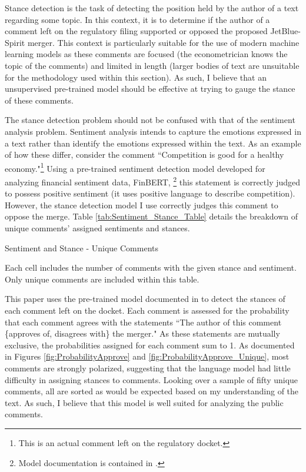 \documentclass{article}
\begin{document}
\begin{appendices}
Stance detection is the task of detecting the position held by the author of a text regarding some topic. In this context, it is to determine if the author of a comment left on the regulatory filing supported or opposed the proposed JetBlue-Spirit merger. This context is particularly suitable for the use of modern machine learning models as these comments are focused (the econometrician knows the topic of the comments) and limited in length (larger bodies of text are unsuitable for the methodology used within this section). As such, I believe that an unsupervised pre-trained model should be effective at trying to gauge the stance of these comments. 

The stance detection problem should not be confused with that of the sentiment analysis problem. Sentiment analysis intends to capture the emotions expressed in a text rather than identify the emotions expressed within the text. As an example of how these differ, consider the comment ``Competition is good for a healthy economy."\footnote{This is an actual comment left on the regulatory docket.} Using a pre-trained sentiment detection model developed for analyzing financial sentiment data, FinBERT, \footnote{Model documentation is contained in \citet{araci_finbert_2019}.} this statement is correctly judged to possess positive sentiment (it uses positive language to describe competition). However, the stance detection model I use correctly judges this comment to oppose the merge. Table \ref{tab:Sentiment_Stance_Table} details the breakdown of unique comments' assigned sentiments and stances. 

\begin{table}
    \caption{Sentiment and Stance - Unique Comments}
    \label{tab:Sentiment_Stance_Table}
    \vspace{-15mm}
    \begin{center}
    
    \end{center}
        \vspace{-5mm}
    \footnotesize{Each cell includes the number of comments with the given stance and sentiment. Only unique comments are included within this table. }
\end{table}

This paper uses the pre-trained model documented in \citet{laurer_less_2024} to detect the stances of each comment left on the docket. Each comment is assessed for the probability that each comment agrees with the statements ``The author of this comment \{approves of, disagrees with\} the merger." As these statements are mutually exclusive, the probabilities assigned for each comment sum to 1. As documented in Figures \ref{fig:ProbabilityApprove} and \ref{fig:ProbabilityApprove_Unique}, most comments are strongly polarized, suggesting that the language model had little difficulty in assigning stances to comments. Looking over a sample of fifty unique comments, all are sorted as would be expected based on my understanding of the text. As such, I believe that this model is well suited for analyzing the public comments.  


\end{appendices}
\end{document}
